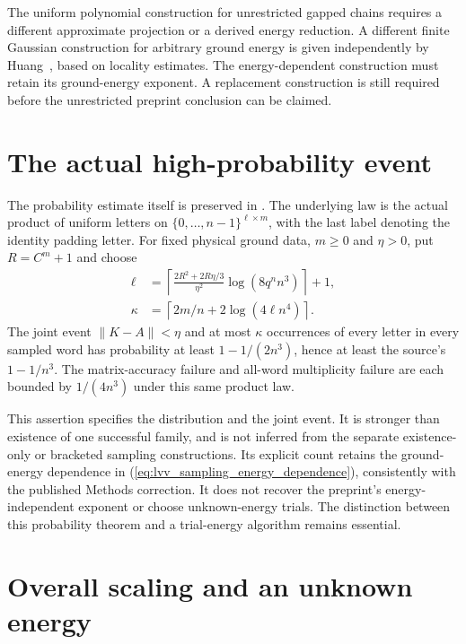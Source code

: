 \documentclass{article}
\begin{document}
The uniform polynomial construction for unrestricted gapped chains
requires a different approximate projection or a derived energy
reduction. A different finite Gaussian construction for arbitrary ground
energy is given independently by Huang~\cite[Section~5.4]{Huang2015GroundState},
based on locality estimates. The energy-dependent construction must retain
its ground-energy exponent.
A replacement construction is still required before the unrestricted
preprint conclusion can be claimed.

\section{The actual high-probability event}

The probability estimate itself is preserved in
.
The underlying law is the actual product of uniform letters on
$\{0,\ldots,n-1\}^{\ell\times m}$, with the last label denoting the
identity padding letter. For fixed physical ground data, $m\ge0$ and
$\eta>0$, put $R=C^m+1$ and choose
\begin{align*}
 \ell&=\left\lceil
   \frac{2R^2+2R\eta/3}{\eta^2}\log(8q^n n^3)
   \right\rceil+1,\\
 \kappa&=\left\lceil 2m/n+2\log(4\ell n^4)\right\rceil.
\end{align*}
The joint event $\|K-A\|<\eta$ and at most $\kappa$ occurrences of every
letter in every sampled word has probability at least $1-1/(2n^3)$,
hence at least the source's $1-1/n^3$. The matrix-accuracy failure and
all-word multiplicity failure are each bounded by $1/(4n^3)$ under this
same product law.

This assertion specifies the distribution and the joint event. It is
stronger than existence of one successful family, and is not inferred
from the separate existence-only or bracketed sampling constructions.
Its explicit count retains the ground-energy dependence in
(\ref{eq:lvv_sampling_energy_dependence}), consistently with the published
Methods correction. It does not recover the preprint's energy-independent
exponent or choose unknown-energy trials. The distinction between this
probability theorem and a trial-energy algorithm remains essential.

\section{Overall scaling and an unknown energy}
\end{document}
